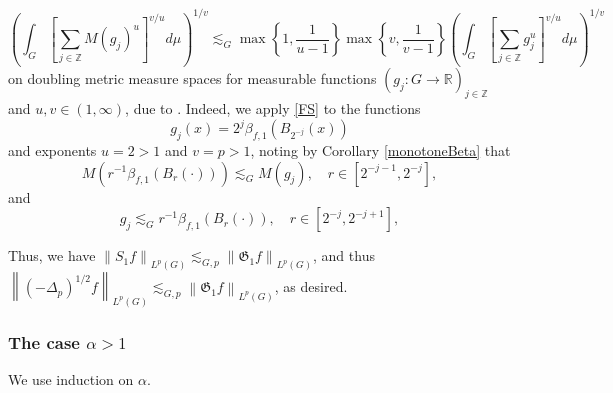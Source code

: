\documentclass[11pt,reqno]{amsart}
\newcommand{\1}{\mathbf 1}
\begin{document}
\begin{equation}\label{FS}
\left( \int_G \left[\sum_{j \in \mathbb{Z}} M\left(g_j
\right)^u \right]^{v/u}  d\mu \right)^{1/v} \lesssim_G \max\left\{1,\frac{1}{u-1}\right\}\max\left\{v,\frac{1}{v-1}\right\}\left( \int_G \left[\sum_{j \in \mathbb{Z}} g_j^u \right]^{v/u}  d\mu \right)^{1/v}
\end{equation}
on doubling metric measure spaces for measurable functions $\left(g_j:G\to \mathbb{R}\right)_{j \in \mathbb{Z}}$  and $u,v \in \left(1,\infty\right)$, due to \cite[Theorem 1.2]{grafakos2009vector}. Indeed, we apply \eqref{FS} to the functions
\[
g_j\left(x\right) = 2^j\beta_{f,1}\left(B_{2^{-j}}\left(x\right)\right)
\]
and exponents $u=2 > 1$ and $v=p>1$, noting by Corollary \ref{monotoneBeta} that
\[
M\left(r^{-1}\beta_{f,1}\left(B_r\left(\cdot\right)\right)\right) \lesssim_G M\left(g_j\right), \quad r \in \left[2^{-j-1},2^{-j}\right],
\]
and
\[
g_j\lesssim_G r^{-1}\beta_{f,1}\left(B_r\left(\cdot\right)\right), \quad r \in\left[2^{-j},2^{-j+1}\right],
\]

Thus, we have $\left\|S_1f\right\|_{L^p\left(G\right)}\lesssim_{G,p} \left\|\mathfrak{G}_1f\right\|_{L^p\left(G\right)}$, and thus $\left\|\left(-\Delta_p\right)^{1/2}f\right\|_{L^p\left(G\right)}\lesssim_{G,p} \left\|\mathfrak{G}_1f\right\|_{L^p\left(G\right)}$, as desired.

\subsubsection{The case $\alpha>1$}\label{subsubsec:gtrsimalpha>1}
We use induction on $\alpha$.
\end{document}
